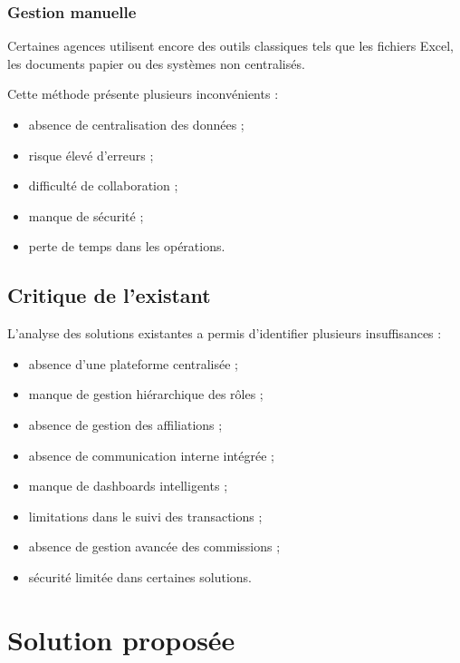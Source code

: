 \documentclass[a4paper,12pt]{report}
\begin{document}
\subsubsection{Gestion manuelle}

Certaines agences utilisent encore des outils classiques tels que les fichiers Excel, les documents papier ou des systèmes non centralisés.

Cette méthode présente plusieurs inconvénients :

\begin{itemize}
\item absence de centralisation des données ;
\item risque élevé d'erreurs ;
\item difficulté de collaboration ;
\item manque de sécurité ;
\item perte de temps dans les opérations.
\end{itemize}


\subsection{Critique de l'existant}

L'analyse des solutions existantes a permis d'identifier plusieurs insuffisances :

\begin{itemize}
\item absence d'une plateforme centralisée ;
\item manque de gestion hiérarchique des rôles ;
\item absence de gestion des affiliations ;
\item absence de communication interne intégrée ;
\item manque de dashboards intelligents ;
\item limitations dans le suivi des transactions ;
\item absence de gestion avancée des commissions ;
\item sécurité limitée dans certaines solutions.
\end{itemize}


\section{Solution proposée}
\end{document}
